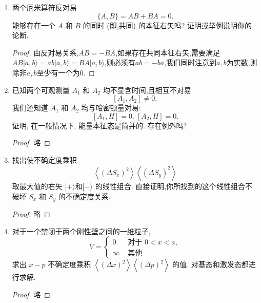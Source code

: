 \begin{enumerate}
	\begin{proof}
		可以,我们利用单位算符即可得出
		\begin{equation}
			AB=AB\textbf{1}=AB\sum_{a^\prime,b^\prime}|a^\prime,b^\prime\rangle\langle a^\prime,b^\prime|=A\sum_{a^\prime,b^\prime}b^\prime|a^\prime,b^\prime\rangle\langle a^\prime,b^\prime|=\sum_{a^\prime,b^\prime}b^\prime a^\prime|a^\prime,b^\prime\rangle\langle a^\prime,b^\prime|=BA
		\end{equation}
		我们发现完备性具有强大的作用.需要着重指出的是,为了涵盖完整的集合组,求和必须同时涵盖 a 和 b .
	\end{proof}
	\item 两个厄米算符反对易
	$$
	\{ A, B\} = {AB} + {BA} = 0.
	$$
	能够存在一个 $A$ 和 $B$ 的同时 (即,共同) 的本征右矢吗? 证明或举例说明你的论断.
	\begin{proof}
		由反对易关系,$AB=-BA$,如果存在共同本征右矢,需要满足$AB|a,b\rangle=ab|a,b\rangle=BA|a,b\rangle $,则必须有$ab=-ba$,我们同时注意到$a,b$为实数,则除非$a,b$至少有一个为$0$.
	\end{proof}
	\item 已知两个可观测量 ${A}_{1}$ 和 ${A}_{2}$ 均不显含时间,且相互不对易
	$$
	\left\lbrack {{A}_{1},{A}_{2}}\right\rbrack \neq 0,
	$$
	我们还知道 ${A}_{1}$ 和 ${A}_{2}$ 均与哈密顿量对易:
	$$
	\left\lbrack {{A}_{1}, H}\right\rbrack = 0.\;\left\lbrack {{A}_{2}, H}\right\rbrack = 0.
	$$
	证明, 在一般情况下, 能量本征态是简并的. 存在例外吗? 
	\begin{proof}
		略
	\end{proof}
	\item 找出使不确定度乘积
	$$
	\left\langle {\left( \Delta {S}_{x}\right) }^{2}\right\rangle \left\langle {\left( \Delta {S}_{y}\right) }^{2}\right\rangle 
	$$
	取最大值的右矢 $\left| {+\rangle \text{和}}\right| - \rangle$ 的线性组合. 直接证明,你所找到的这个线性组合不破坏 ${S}_{x}$ 和 ${S}_{y}$ 的不确定度关系.
	\begin{proof}
		略
	\end{proof}
	\item 对于一个禁闭于两个刚性壁之间的一维粒子,
	$$
	V = \left\{ \begin{array}{ll} 0 & \text{ 对于 }0 < x < a, \\ \infty & \text{ 其他 } \end{array}\right.
	$$
	求出 $x - p$ 不确定度乘积 $\left\langle {\left( \Delta x\right) }^{2}\right\rangle \left\langle {\left( \Delta p\right) }^{2}\right\rangle$ 的值. 对基态和激发态都进行求解.
	\begin{proof}
		略
	\end{proof}

\end{enumerate}
